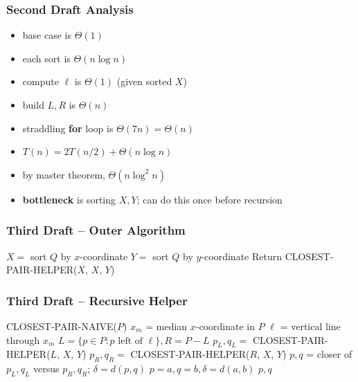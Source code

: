 \documentclass{beamer}
\begin{document}
\begin{frame} \frametitle{Second Draft Analysis}
\begin{itemize}
  \item base case is $\Theta(1)$
  \item each sort is $\Theta(n \log n)$
  \item compute $\ell$ is $\Theta(1)$ (given sorted $X$)
  \item build $L, R$ is $\Theta(n)$
  \item straddling \textbf{for} loop is $\Theta(7n) = \Theta(n)$
  \item $T(n) = 2 T(n/2) + \Theta(n \log n)$
  \item by master theorem, $\Theta(n \log^2 n)$
  \item \textbf{bottleneck} is sorting $X, Y$; can do this once before recursion
\end{itemize}
\end{frame}

\begin{frame} \frametitle{Third Draft -- Outer Algorithm}
\begin{algorithmic}[1]
    \State $X = $ sort $Q$ by $x$-coordinate
    \State $Y = $ sort $Q$ by $y$-coordinate
    \State Return CLOSEST-PAIR-HELPER($X$, $X$, $Y$)
  \EndFunction
\end{algorithmic}
\end{frame}

\begin{frame} \frametitle{Third Draft -- Recursive Helper}
  {\footnotesize
\begin{algorithmic}[1]
      \State \Return CLOSEST-PAIR-NAIVE($P$)
    \Else
      \State $x_m$ = median $x$-coordinate in $P$
      \State $\ell$ = vertical line through $x_m$
      \State $L = \{p \in P : p \text{ left of } \ell\}, R = P-L$
      \State $p_L, q_L = $ CLOSEST-PAIR-HELPER($L$, $X$, $Y$)
      \State $p_R, q_R = $ CLOSEST-PAIR-HELPER($R$, $X$, $Y$)
      \State $p, q$ = closer of $p_L, q_L$ versus $p_R, q_R$; $\delta=d(p,q)$
            \State $p=a, q=b, \delta=d(a,b)$
          \EndIf
        \EndFor
      \EndFor
      \State \Return $p, q$
    \EndIf
  \EndFunction
\end{algorithmic}
}
\end{frame}
\end{document}
